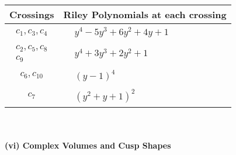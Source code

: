 \documentclass[1p]{elsarticle_modified}
\theoremstyle{definition}
\begin{document}
\begin{tabular}{m{50pt}|m{274pt}}
Crossings & \hspace{64pt}Riley Polynomials at each crossing \\
\hline $$\begin{aligned}c_{1},c_{3},c_{4}\end{aligned}$$&$\begin{aligned}
&y^4-5 y^3+6 y^2+4 y+1
\end{aligned}$\\
\hline $$\begin{aligned}c_{2},c_{5},c_{8}\\c_{9}\end{aligned}$$&$\begin{aligned}
&y^4+3 y^3+2 y^2+1
\end{aligned}$\\
\hline $$\begin{aligned}c_{6},c_{10}\end{aligned}$$&$\begin{aligned}
&(y-1)^4
\end{aligned}$\\
\hline $$\begin{aligned}c_{7}\end{aligned}$$&$\begin{aligned}
&(y^2+y+1)^2
\end{aligned}$\\
\hline
\end{tabular}\\~\\
\newpage\flushleft \textbf{(vi) Complex Volumes and Cusp Shapes}
\end{document}
